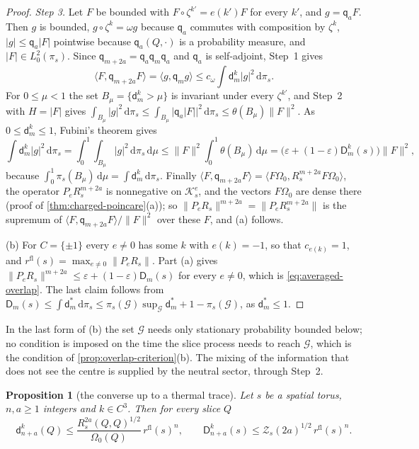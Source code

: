 \documentclass[11pt,a4paper]{amsart}
\newtheorem{proposition}[theorem]{Proposition}
\theoremstyle{definition}
\theoremstyle{remark}
\numberwithin{equation}{section}
\newcommand{\Kspace}{\mathcal{K}}    %
\newcommand{\ip}[2]{\langle #1,#2\rangle}  %
\newcommand{\norm}[1]{\lVert #1\rVert}     %
\newcommand{\abs}[1]{\lvert #1\rvert}      %
\newcommand{\dd}{\,\mathrm{d}}             %
\newcommand{\TT}{\mathbb{T}}               %
\newcommand{\Zc}{\mathcal{Z}}              %
\newcommand{\Zs}[2]{\Zc_{#1}(#2)}          %
\newcommand{\Omegazero}{\Omega_0}          %
\begin{document}
\begin{proof}
\emph{Step 3.} Let $F$ be bounded with $F\circ\zeta^{k'}=e(k')F$ for every $k'$, and $g=\mathsf q_aF$. Then $g$ is bounded, $g\circ\zeta^k=\omega g$ because $\mathsf q_a$ commutes with composition by $\zeta^k$, $\abs g\le\mathsf q_a\abs F$ pointwise because $\mathsf q_a(Q,\cdot)$ is a probability measure, and $\abs F\in L^2_0(\pi_s)$. Since $\mathsf q_{m+2a}=\mathsf q_a\mathsf q_m\mathsf q_a$ and $\mathsf q_a$ is self-adjoint, Step~1 gives
\[
\ip F{\mathsf q_{m+2a}F}=\ip g{\mathsf q_mg}\le c_\omega\int\mathsf d^k_m\abs g^2\dd\pi_s .
\]
For $0\le\mu<1$ the set $B_\mu=\{\mathsf d^k_m>\mu\}$ is invariant under every $\zeta^{k'}$, and Step~2 with $H=\abs F$ gives $\int_{B_\mu}\abs g^2\dd\pi_s\le\int_{B_\mu}\abs{\mathsf q_a\abs F}^2\dd\pi_s\le\theta(B_\mu)\norm F^2$. As $0\le\mathsf d^k_m\le1$, Fubini's theorem gives
\[
\int\mathsf d^k_m\abs g^2\dd\pi_s=\int_0^1\!\!\int_{B_\mu}\abs g^2\dd\pi_s\dd\mu\le\norm F^2\int_0^1\theta(B_\mu)\dd\mu=\bigl(\varepsilon+(1-\varepsilon)\mathsf D^k_m(s)\bigr)\norm F^2,
\]
because $\int_0^1\pi_s(B_\mu)\dd\mu=\int\mathsf d^k_m\dd\pi_s$. Finally $\ip F{\mathsf q_{m+2a}F}=\ip{F\Omegazero}{R_s^{m+2a}F\Omegazero}$, the operator $P_eR_s^{m+2a}$ is nonnegative on $\Kspace^e_s$, and the vectors $F\Omegazero$ are dense there (proof of \cref{thm:charged-poincare}(a)); so $\norm{P_eR_s}^{m+2a}=\norm{P_eR_s^{m+2a}}$ is the supremum of $\ip F{\mathsf q_{m+2a}F}/\norm F^2$ over these $F$, and (a) follows.

(b) For $C=\{\pm1\}$ every $e\ne0$ has some $k$ with $e(k)=-1$, so that $c_{e(k)}=1$, and $r^{\mathrm{fl}}(s)=\max_{e\ne0}\norm{P_eR_s}$. Part (a) gives $\norm{P_eR_s}^{m+2a}\le\varepsilon+(1-\varepsilon)\mathsf D_m(s)$ for every $e\ne0$, which is \eqref{eq:averaged-overlap}. The last claim follows from $\mathsf D_m(s)\le\int\mathsf d^\ast_m\dd\pi_s\le\pi_s(\mathcal G)\sup_{\mathcal G}\mathsf d^\ast_m+1-\pi_s(\mathcal G)$, as $\mathsf d^\ast_m\le1$.
\end{proof}

In the last form of (b) the set $\mathcal G$ needs only stationary probability bounded below; no condition is imposed on the time the slice process needs to reach $\mathcal G$, which is the condition of \cref{prop:overlap-criterion}(b). The mixing of the information that does not see the centre is supplied by the neutral sector, through Step~2.

\begin{proposition}[the converse up to a thermal trace]\label{prop:overlap-converse}
Let $s$ be a spatial torus, $n,a\ge1$ integers and $k\in C^3$. Then for every slice $Q$
\[
\mathsf d^k_{n+a}(Q)\le\frac{R_s^{2a}(Q,Q)^{1/2}}{\Omegazero(Q)}\,r^{\mathrm{fl}}(s)^n,\qquad \mathsf D^k_{n+a}(s)\le\Zs{s}{2a}^{1/2}\,r^{\mathrm{fl}}(s)^n .
\]
\end{proposition}
\end{document}
